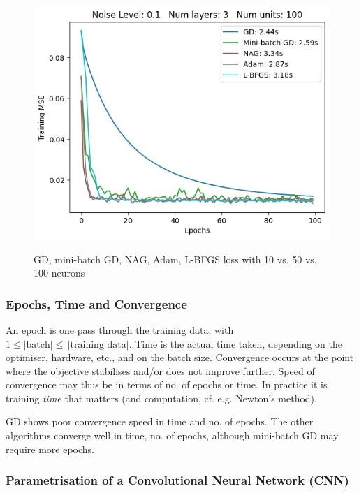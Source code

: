 \begin{figure}[h!]
\begin{minipage}[t]{0.32\textwidth}
        \includegraphics[width=\textwidth]{figures/noise-level-0-1-num-layers-3-num-units-100.png}
        \label{fig:noise-level-0-1-num-layers-3-num-units-100}
    \end{minipage}
    \vspace{-15pt}
    \caption{GD, mini-batch GD, NAG, Adam, L-BFGS loss with 10 vs. 50 vs. 100 neurons}
    \vspace{-2.5pt}
\end{figure}

\vspace{-15pt}

\subsubsection{Epochs, Time and Convergence}

An epoch is one pass through the training data, with $1 \leq \lvert \text{batch} \rvert \leq \, \lvert \text{training data} \rvert$.
Time is the actual time taken, depending on the optimiser, hardware, etc., and on the batch size.
Convergence occurs at the point where the objective stabilises and/or does not improve further.
Speed of convergence may thus be in terms of no. of epochs or time.
In practice it is training \textit{time} that matters (and computation, cf. e.g. Newton's method).

GD shows poor convergence speed in time and no. of epochs.
The other algorithms converge well in time, no. of epochs, although mini-batch GD may require more epochs.


\subsubsection{Parametrisation of a Convolutional Neural Network (CNN)}

